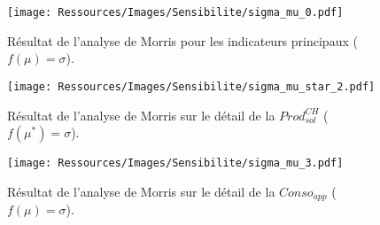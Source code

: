 
\begin{figure}
    \centering
    \texttt{[image: Ressources/Images/Sensibilite/sigma\_mu\_0.pdf]}
    \caption[Résultat de l’analyse de Morris pour les indicateurs principaux
             ($f(\mu) = \sigma$)]
            {Résultat de l’analyse de Morris pour les indicateurs principaux
             ($f(\mu) = \sigma$).}
    \label{fig:objectifs_mu}
\end{figure}

\begin{figure}
    \centering
    \texttt{[image: Ressources/Images/Sensibilite/sigma\_mu\_star\_2.pdf]}
    \caption[Résultat de l’analyse de Morris sur le détail de la
             $Prod_{sol}^{CH}$ ($f(\mu^{*}) = \sigma$)]
            {Résultat de l’analyse de Morris sur le détail de la
             $Prod_{sol}^{CH}$ ($f(\mu^{*}) = \sigma$).}
    \label{fig:prod_sol_chauffage_mu_star}
\end{figure}




\begin{figure}
    \centering
    \texttt{[image: Ressources/Images/Sensibilite/sigma\_mu\_3.pdf]}
    \caption[Résultat de l’analyse de Morris sur le détail de la
             $Conso_{app}$ ($f(\mu) = \sigma$)]
            {Résultat de l’analyse de Morris sur le détail de la
             $Conso_{app}$ ($f(\mu) = \sigma$).}
    \label{fig:conso_app_mu}
\end{figure}


